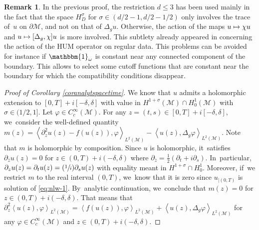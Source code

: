 \documentclass[10pt]{amsart}
\newcommand{\Psfrac}[2]{(\sfrac{#1}{#2})}
\newcommand\mto{\mathchoice{\longmapsto}{\mapsto}{\mapsto}{\mapsto}}
\theoremstyle{definition}
\newtheorem{remark}[theorem]{Remark}
\let\mc\mathcal
\newcommand{\M}{\mc{M}}
\begin{document}
\begin{remark}\label{rk:comm-reg}
In the previous proof, the restriction $d\leq 3$ has been used mainly in the fact that the space $H^{\sigma}_D$ for $\sigma\in (d/2-1, d/2-1/2)$ only involves the trace of~$u$ on $\partial \M$, and not on that of $\Delta_g u$. Otherwise, the action of the maps $u \mto \chi u$ and $u \mto [\Delta_g, \chi ]u$ is more involved. This subtlety already appeared in \cite{DL:09} concerning the action of the HUM operator on regular data. This problems can be avoided for instance if $\mathbbm{1}_{\omega}$ is constant near any connected component of the boundary. This allows to select some cutoff functions that are constant near the boundary for which the compatibility conditions disappear.
\end{remark}

\begin{proof}[Proof of Corollary \ref{coranalytspacetime}]
We know that $u$ admits a holomorphic extension to $[0,T]+i[-\delta,\delta]$ with value in $H^{1+\sigma}(\M)\cap H^1_0(\M)$ with $\sigma\in (1/2,1]$. Let $\varphi\in C^{\infty}_c(\M)$. For any $z=(t,s)\in [0,T]+i[-\delta,\delta]$, we~consider the well-defined quantity $m(z)=\left<\partial_z^2u(z)-f(u(z)),\varphi\right>_{L^2(\M)}-\left<u(z),\Delta_g \varphi\right>_{L^2(\M)}$. Note that $m$ is holomorphic by composition. Since $u$ is holomorphic, it~satisfies $\partial_{\bar z}u(z)=0$ for $z\in (0,T)+i(-\delta,\delta)$ where $\partial_{\bar z}=\frac{1}{2}\left(\partial_t+i\partial_s\right)$. In~particular, $\partial_{z}u(z)=\partial_t u(z)=\Psfrac{1}{i}\partial_s u(z)$ with equality meant in $H^{1+\sigma}\cap H^1_0$. Moreover, if~we restrict $m$ to the real interval $(0,T)$, we~know that it is zero since $u_{\left|(0,T)\right.}$ is solution of \eqref{eq:nlw-1}. By~analytic continuation, we~conclude that $m(z)=0$ for $z\in (0,T)+i(-\delta,\delta)$. That means that $\partial_z^2 \left<u(z),\varphi\right>_{L^2(\M)}=\left<f(u(z)),\varphi\right>_{L^2(\M)}+\left<u(z),\Delta_g \varphi\right>_{L^2(\M)}$ for any $\varphi\in C^{\infty}_c(\M)$ and $z\in (0,T)+i(-\delta,\delta)$.


\end{proof}
\end{document}
